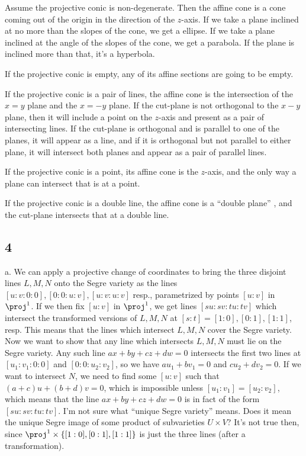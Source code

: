 \documentclass{article}
\begin{document}
Assume the projective conic is non-degenerate. Then the affine cone is a cone coming out of the origin in the direction of the $z$-axis. If we take a plane inclined at no more than the slopes of the cone, we get a ellipse. If we take a plane inclined at the angle of the slopes of the cone, we get a parabola. If the plane is inclined more than that, it's a hyperbola. 

If the projective conic is empty, any of its affine sections are going to be empty. 

If the projective conic is a pair of lines, the affine cone is the intersection of the $x=y$ plane and the $x=-y$ plane. If the cut-plane is not orthogonal to the $x-y$ plane, then it will include a point on the $z$-axis and present as a pair of intersecting lines. If the cut-plane is orthogonal and is parallel to one of the planes, it will appear as a line, and if it is orthogonal but not parallel to either plane, it will intersect both planes and appear as a pair of parallel lines.

If the projective conic is a point, its affine cone is the $z$-axis, and the only way a plane can intersect that is at a point.

If the projective conic is a double line, the affine cone is a ``double plane'' , and the cut-plane intersects that at a double line.
\subsection*{4}
a. We can apply a projective change of coordinates to bring the three disjoint lines $L,M,N$ onto the Segre variety as the lines $[u:v:0:0],[0:0:u:v],[u:v:u:v]$ resp., parametrized by points $[u:v]$ in $\proj^1$. If we then fix $[u:v]$ in $\proj^1$, we get lines $[su:sv:tu:tv]$ which intersect the transformed versions of $L,M,N$ at $[s:t]=[1:0],[0:1],[1:1]$, resp. This means that the lines which intersect $L,M,N$ cover the Segre variety. Now we want to show that any line which intersects $L,M,N$ must lie on the Segre variety. Any such line $ax+by+cz+dw=0$ intersects the first two lines at $[u_1:v_1:0:0]$ and $[0:0:u_2:v_2]$, so we have $au_1+bv_1=0$ and $cu_2+dv_2=0$. If we want to intersect $N$, we need to find some $[u:v]$ such that $(a+c)u+(b+d)v=0$, which is impossible unless $[u_1:v_1]=[u_2:v_2]$, which means that the line $ax+by+cz+dw=0$ is in fact of the form $[su:sv:tu:tv]$. I'm not sure what ``unique Segre variety'' means. Does it mean the unique Segre image of some product of subvarieties $U\times V$? It's not true then, since $\proj^1\times\{[1:0],[0:1],[1:1]\}$ is just the three lines (after a transformation).
\end{document}
